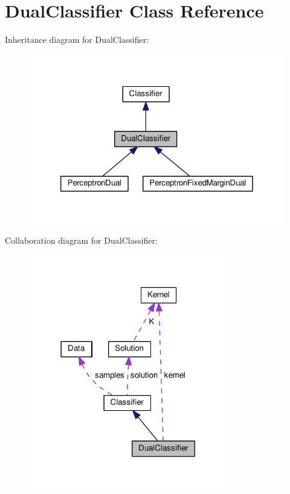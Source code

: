 \hypertarget{class_dual_classifier}{}\section{Dual\+Classifier Class Reference}
\label{class_dual_classifier}


Inheritance diagram for Dual\+Classifier\+:
\nopagebreak
\begin{figure}[H]
\begin{center}
\leavevmode
\includegraphics[width=320pt]{class_dual_classifier__inherit__graph}
\end{center}
\end{figure}


Collaboration diagram for Dual\+Classifier\+:
\nopagebreak
\begin{figure}[H]
\begin{center}
\leavevmode
\includegraphics[width=246pt]{class_dual_classifier__coll__graph}
\end{center}
\end{figure}
